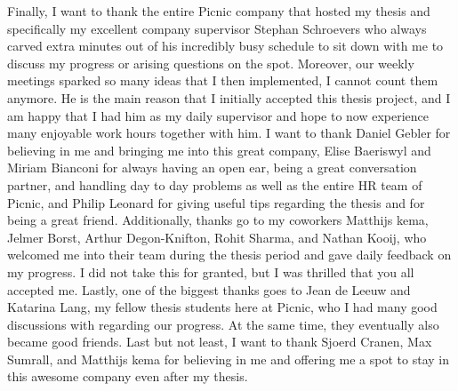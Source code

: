 Finally, I want to thank the entire Picnic company that hosted my thesis and
specifically my excellent company supervisor Stephan Schroevers who always carved extra minutes
out of his incredibly busy schedule to sit down with me to discuss my progress
or arising questions on the spot. Moreover, our weekly meetings sparked so many
ideas that I then implemented, I cannot count them anymore. He is the main
reason that I initially accepted this thesis project, and I am happy that I had
him as my daily supervisor and hope to now experience many enjoyable work hours
together with him. I want to thank Daniel Gebler for believing in me and
bringing me into this great company, Elise Baeriswyl and Miriam Bianconi
for always having an open ear, being a great conversation partner,
and handling day to day problems as well as the entire HR team of Picnic,
and Philip Leonard for giving useful tips regarding the thesis and for being
a great friend.
Additionally, thanks go to my coworkers Matthijs \IJ{}kema, Jelmer Borst,
Arthur Degon-Knifton, Rohit Sharma, and Nathan Kooij, who welcomed me into their
team during the thesis period and gave daily feedback on my progress.
I did not take this for granted, but I was thrilled that you all accepted me.
Lastly, one of the biggest thanks goes to Jean de Leeuw and Katarina Lang,
my fellow thesis students here at Picnic, who I had many good discussions with
regarding our progress. At the same time, they eventually also became good
friends.
Last but not least, I want to thank Sjoerd Cranen, Max Sumrall,
and Matthijs \IJ{}kema for believing in me and offering me a spot to stay in this
awesome company even after my thesis.

\vfill

\cleardoublepage

\raggedbottom
